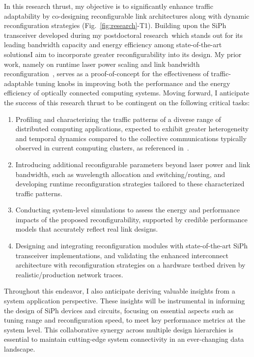 In this research thrust, my objective is to significantly enhance traffic adaptability by co-designing reconfigurable link architectures along with dynamic reconfiguration strategies (Fig.~\ref{fig:research}-T1). Building upon the SiPh transceiver developed during my postdoctoral research~\cite{wangScalableArchitectureSubpJ2023,wangCICC2024}\textemdash which stands out for its leading bandwidth capacity and energy efficiency among state-of-the-art solutions\textemdash I aim to incorporate greater reconfigurability into its design. My prior work, namely on runtime laser power scaling and link bandwidth reconfiguration~\cite{wangTaskMappingAssistedLaser2019,wangTrafficAdaptivePowerReconfiguration2021,brianJOCN}, serves as a proof-of-concept for the effectiveness of traffic-adaptable tuning knobs in improving both the performance and the energy efficiency of optically connected computing systems. Moving forward, I anticipate the success of this research thrust to be contingent on the following critical tasks:
\begin{enumerate}[nosep]
    \item Profiling and characterizing the traffic patterns of a diverse range of distributed computing applications, expected to exhibit greater heterogeneity and temporal dynamics compared to the collective communications typically observed in current computing clusters, as referenced in~\cite{brianJOCN}.
    \item Introducing additional reconfigurable parameters beyond laser power and link bandwidth, such as wavelength allocation and switching/routing, and developing runtime reconfiguration strategies tailored to these characterized traffic patterns.
    \item Conducting system-level simulations to assess the energy and performance impacts of the proposed reconfigurability, supported by credible performance models that accurately reflect real link designs.
    \item Designing and integrating reconfiguration modules with state-of-the-art SiPh transceiver implementations, and validating the enhanced interconnect architecture with reconfiguration strategies on a hardware testbed driven by realistic/production network traces.
\end{enumerate}
Throughout this endeavor, I also anticipate deriving valuable insights from a system application perspective. These insights will be instrumental in informing the design of SiPh devices and circuits, focusing on essential aspects such as tuning range and reconfiguration speed, to meet key performance metrics at the system level. This collaborative synergy across multiple design hierarchies is essential to maintain cutting-edge system connectivity in an ever-changing data landscape.


